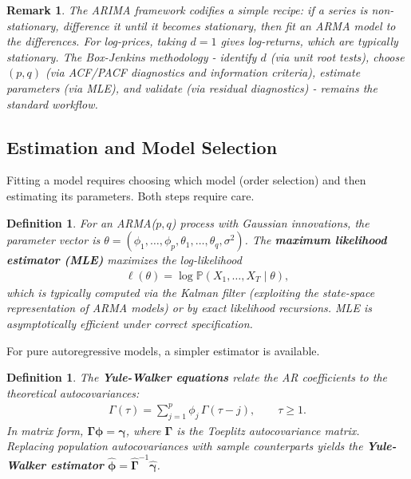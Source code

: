 \documentclass{report}
\theoremstyle{spacedplain}
\theoremstyle{spaceddefinition}
\newtheorem{definition}[theorem]{Definition}
\theoremstyle{spacedremark}
\newtheorem{remark}[theorem]{Remark}
\begin{document}
\begin{remark}
The ARIMA framework codifies a simple recipe: if a series is non-stationary, difference it until it becomes stationary, then fit an ARMA model to the differences. For log-prices, taking $d=1$ gives log-returns, which are typically stationary. The Box-Jenkins methodology - identify $d$ (via unit root tests), choose $(p,q)$ (via ACF/PACF diagnostics and information criteria), estimate parameters (via MLE), and validate (via residual diagnostics) - remains the standard workflow.
\end{remark}


\subsection{Estimation and Model Selection}

Fitting a model requires choosing which model (order selection) and then estimating its parameters. Both steps require care.

\begin{definition}
For an ARMA($p,q$) process with Gaussian innovations, the parameter vector is $\theta = (\phi_1, \ldots, \phi_p, \theta_1, \ldots, \theta_q, \sigma^2)$. The \textbf{maximum likelihood estimator (MLE)} maximizes the log-likelihood
\begin{align}
    \ell(\theta) = \log \mathbb{P}(X_1, \ldots, X_T \mid \theta),
\end{align}
which is typically computed via the Kalman filter (exploiting the state-space representation of ARMA models) or by exact likelihood recursions. MLE is asymptotically efficient under correct specification.
\end{definition}

For pure autoregressive models, a simpler estimator is available.

\begin{definition}
The \textbf{Yule-Walker equations} relate the AR coefficients to the theoretical autocovariances:
\begin{align}
    \Gamma(\tau) = \sum_{j=1}^p \phi_j\, \Gamma(\tau - j), \qquad \tau \geq 1.
\end{align}
In matrix form, $\boldsymbol{\Gamma} \boldsymbol{\phi} = \boldsymbol{\gamma}$, where $\boldsymbol{\Gamma}$ is the Toeplitz autocovariance matrix. Replacing population autocovariances with sample counterparts yields the \textbf{Yule-Walker estimator} $\hat{\boldsymbol{\phi}} = \hat{\boldsymbol{\Gamma}}^{-1}\hat{\boldsymbol{\gamma}}$.
\end{definition}
\end{document}
